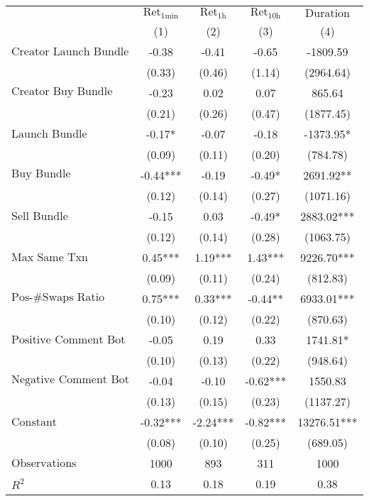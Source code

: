 \begin{tabular}{lcccc}
\hline
 & $\text{Ret}_{\text{1min}}$ & $\text{Ret}_{\text{1h}}$ & $\text{Ret}_{\text{10h}}$ & $\text{Duration}$ \\
 & (1) & (2) & (3) & (4)\\
\hline
$\text{Creator Launch Bundle}$ & -0.38 & -0.41 & -0.65 & -1809.59 \\
 & (0.33) & (0.46) & (1.14) & (2964.64) \\
$\text{Creator Buy Bundle}$ & -0.23 & 0.02 & 0.07 & 865.64 \\
 & (0.21) & (0.26) & (0.47) & (1877.45) \\
$\text{Launch Bundle}$ & -0.17* & -0.07 & -0.18 & -1373.95* \\
 & (0.09) & (0.11) & (0.20) & (784.78) \\
$\text{Buy Bundle}$ & -0.44*** & -0.19 & -0.49* & 2691.92** \\
 & (0.12) & (0.14) & (0.27) & (1071.16) \\
$\text{Sell Bundle}$ & -0.15 & 0.03 & -0.49* & 2883.02*** \\
 & (0.12) & (0.14) & (0.28) & (1063.75) \\
$\text{Max Same Txn}$ & 0.45*** & 1.19*** & 1.43*** & 9226.70*** \\
 & (0.09) & (0.11) & (0.24) & (812.83) \\
$\text{Pos-\#Swaps Ratio}$ & 0.75*** & 0.33*** & -0.44** & 6933.01*** \\
 & (0.10) & (0.12) & (0.22) & (870.63) \\
$\text{Positive Comment Bot}$ & -0.05 & 0.19 & 0.33 & 1741.81* \\
 & (0.10) & (0.13) & (0.22) & (948.64) \\
$\text{Negative Comment Bot}$ & -0.04 & -0.10 & -0.62*** & 1550.83 \\
 & (0.13) & (0.15) & (0.23) & (1137.27) \\
$\text{Constant}$ & -0.32*** & -2.24*** & -0.82*** & 13276.51*** \\
 & (0.08) & (0.10) & (0.25) & (689.05) \\
$\text{Observations}$ & 1000 & 893 & 311 & 1000 \\
$R^2$ & 0.13 & 0.18 & 0.19 & 0.38 \\
\hline
\end{tabular}